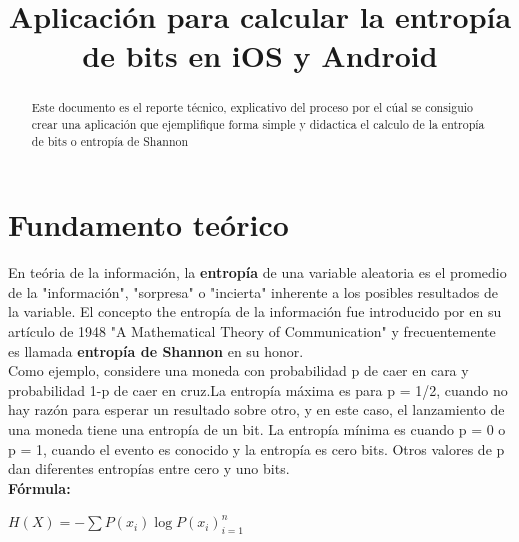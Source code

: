 \documentclass[conference]{IEEEtran}
\begin{document}
\renewcommand\IEEEkeywordsname{Palabras clave}

{\footnotesize 
\title{Aplicación para calcular la entropía de bits en iOS y Android}
}

\author{
}

\maketitle

\begin{abstract}
Este documento es el reporte técnico, explicativo del proceso por el cúal se consiguio crear una aplicación que ejemplifique forma simple y didactica el calculo de la entropía de bits o entropía de Shannon
\end{abstract}


\section{Fundamento teórico}
En teória de la información, la 
\textbf{entropía }
de una variable aleatoria es el promedio de la "información", "sorpresa" o "incierta" inherente a los posibles resultados de la variable. El concepto the entropía de la información fue introducido por 
en su artículo de 1948 "A Mathematical Theory of Communication" y frecuentemente es llamada 
\textbf{entropía de Shannon }
en su honor. \\
Como ejemplo, considere una moneda con probabilidad p de caer en cara y probabilidad 1-p de caer en cruz.La entropía máxima es para p = 1/2, cuando no hay razón para esperar un resultado sobre otro, y en este caso, el lanzamiento de una moneda tiene una entropía de un bit. La entropía mínima es cuando p = 0 o p = 1, cuando el evento es conocido y la entropía es cero bits. Otros valores de p dan diferentes entropías entre cero y uno bits.
\\
\textbf{Fórmula:}\\

\begin{centering}
    $H(X)=-\sum{P(x_i)\log{P(x_i)}}_{i=1}^{n}$\\
\end{centering}
\end{document}
